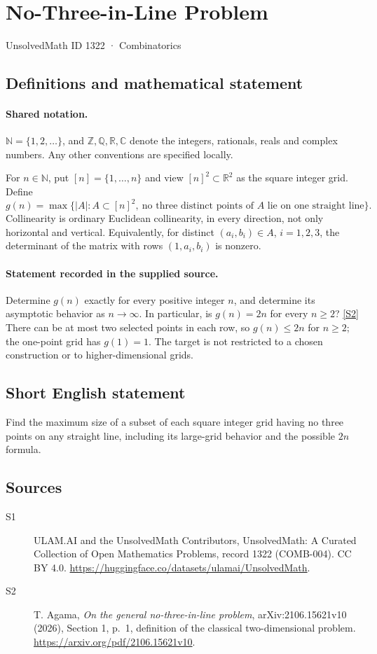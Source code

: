 \documentclass[11pt]{article}
\newcommand{\sref}[2]{\hyperlink{source:#1:#2}{[S#2]}}
\begin{document}
\setcounter{section}{1321}
\section{No-Three-in-Line Problem}\label{1322}
{\small\sffamily UnsolvedMath ID 1322 · Combinatorics}
\subsection{Definitions and mathematical statement}

\paragraph{Shared notation.}$\mathbb N=\{1,2,\ldots\}$, and $\mathbb Z,\mathbb Q,\mathbb R,\mathbb C$ denote the integers, rationals, reals and complex numbers. Any other conventions are specified locally.


For $n\in\mathbb N$, put $[n]=\{1,\ldots,n\}$ and view $[n]^2\subset\mathbb R^2$ as the square integer grid. Define
\[g(n)=\max\{|A|:A\subset[n]^2,\ \text{no three distinct points of }A\text{ lie on one straight line}\}.\]
Collinearity is ordinary Euclidean collinearity, in every direction, not only horizontal and vertical. Equivalently, for distinct $(a_i,b_i)\in A$, $i=1,2,3$, the determinant of the matrix with rows $(1,a_i,b_i)$ is nonzero.
\paragraph{Statement recorded in the supplied source.}
Determine $g(n)$ exactly for every positive integer $n$, and determine its asymptotic behavior as $n\to\infty$. In particular, is $g(n)=2n$ for every $n\ge2$? \sref{1322}{2}
There can be at most two selected points in each row, so $g(n)\le2n$ for $n\ge2$; the one-point grid has $g(1)=1$. The target is not restricted to a chosen construction or to higher-dimensional grids.
\subsection{Short English statement}
Find the maximum size of a subset of each square integer grid having no three points on any straight line, including its large-grid behavior and the possible $2n$ formula.
\subsection{Sources}
\begin{description}
\item[\hypertarget{source:1322:1}{S1}] ULAM.AI and the UnsolvedMath Contributors, UnsolvedMath: A Curated Collection of Open Mathematics Problems, record 1322 (COMB-004). CC BY 4.0. \url{https://huggingface.co/datasets/ulamai/UnsolvedMath}.
\item[\hypertarget{source:1322:2}{S2}] T. Agama, \emph{On the general no-three-in-line problem}, arXiv:2106.15621v10 (2026), Section 1, p.\ 1, definition of the classical two-dimensional problem. \url{https://arxiv.org/pdf/2106.15621v10}.
\end{description}
\label{end:1322}
\end{document}
